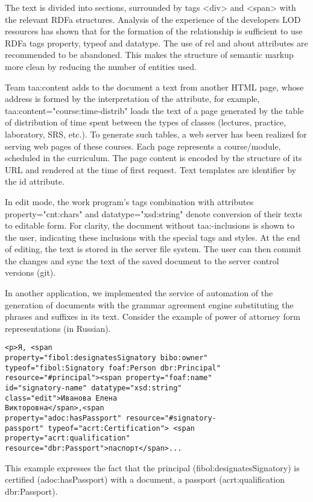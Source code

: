 \documentclass[12pt]{llncs}
\begin{document}
The text is divided into sections, surrounded by tags
<div> and <span> with the
relevant RDFa structures. Analysis of the experience of the developers
LOD resources has shown that for the formation of the relationship is
sufficient to use RDFa tags property, typeof and datatype. The use of
rel and about attributes are recommended to be abandoned. This makes the
structure of semantic markup more clean by reducing the number of
entities used.

Team taa:content adds to the document a text from another HTML page,
whose address is formed by the interpretation of the attribute, for
example, taa:content="course:time-distrib" loads the text of a page
generated by the table of distribution of time spent between the types
of classes (lectures, practice, laboratory, SRS, etc.). To generate such
tables, a web server has been realized for serving web pages of these
courses. Each page represents a course/module, scheduled in the
curriculum. The page content is encoded by the structure of its URL and
rendered at the time of first request. Text templates are identifier by
the id attribute.

In edit mode, the work program's tags combination with attributes
property="cnt:chars" and datatype="xsd:string" denote conversion of
their texts to editable form. For clarity, the document without
taa:-inclusions is shown to the user, indicating these inclusions with
the special tags and styles. At the end of editing, the text is stored
in the server file system. The user can then commit the changes and sync
the text of the saved document to the server control versions (git).

In another application, we implemented the service of automation of the
generation of documents with the grammar agreement engine substituting
the phrases and suffixes in its text. Consider the example of power of
attorney form representations (in Russian).

\begin{verbatim}
<p>Я, <span
property="fibol:designatesSignatory bibo:owner"
typeof="fibol:Signatory foaf:Person dbr:Principal"
resource="#principal"><span property="foaf:name"
id="signatory-name" datatype="xsd:string"
class="edit">Иванова Елена
Викторовна</span>,<span
property="adoc:hasPassport" resource="#signatory-
passport" typeof="acrt:Certification"> <span
property="acrt:qualification"
resource="dbr:Passport">паспорт</span>...
\end{verbatim}


This example expresses the fact that the principal
(fibol:designates\-Signatory) is certified (adoc:hasPassport) with a
document, a passport (acrt:qualification dbr:Passport).
\end{document}
